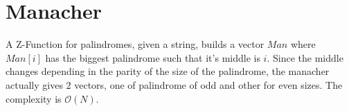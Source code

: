 \section{Manacher}
A Z-Function for palindromes, given a string, builds a vector $Man$ where $Man[i]$ has the biggest palindrome such that it's 
middle is $i$. Since the middle changes depending in the parity of the size of the palindrome, the manacher actually gives $2$ vectors, 
one of palindrome of odd and other for even sizes. The complexity is $\mathcal{O}(N)$.

